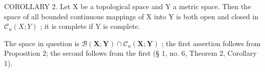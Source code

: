 COROLLARY 2. Let X be a topological space and Y a metric space. Then the space of all bounded continuous mappings of X into Y is both open and closed in \(\mathcal{C}_u(X;Y)\) ; it is complete if Y is complete.

The space in question is \(\mathcal{B}(\mathbf{X};\mathbf{Y})\cap \mathcal{C}_u(\mathbf{X};\mathbf{Y})\) ; the first assertion follows from Proposition 2; the second follows from the first (§ 1, no. 6, Theorem 2, Corollary 1).

